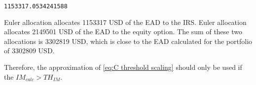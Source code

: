     \begin{Verbatim}[commandchars=\\\{\}]
1153317.0534241588
    \end{Verbatim}

    Euler allocation allocates 1153317 USD of the EAD to the IRS. Euler
allocation allocates 2149501 USD of the EAD to the equity option. The
sum of these two allocations is 3302819 USD, which is close to the EAD
calculated for the portfolio of 3302809 USD.

    
    Therefore, the approximation of \ref{eq:C threshold scaling} should only
be used if the \(IM_{calc} > TH_{IM}\).


